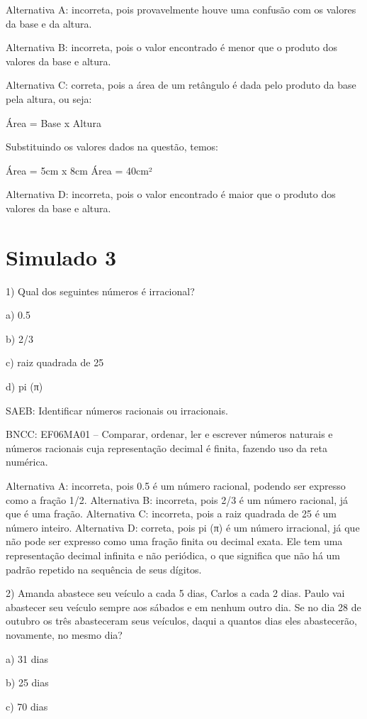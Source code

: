 Alternativa A: incorreta, pois provavelmente houve uma confusão com os
valores da base e da altura.

Alternativa B: incorreta, pois o valor encontrado é menor que o produto
dos valores da base e altura.

Alternativa C: correta, pois a área de um retângulo é dada pelo produto
da base pela altura, ou seja:

Área = Base x Altura

Substituindo os valores dados na questão, temos:

Área = 5cm x 8cm Área = 40cm²

Alternativa D: incorreta, pois o valor encontrado é maior que o produto
dos valores da base e altura.

\chapter{Simulado 3}

1) Qual dos seguintes números é irracional?

a) 0.5

b) 2/3

c) raiz quadrada de 25

d) pi (π)

SAEB: Identificar números racionais ou irracionais.

BNCC: EF06MA01 -- Comparar, ordenar, ler e escrever números naturais e
números racionais cuja representação decimal é finita, fazendo uso da
reta numérica.

Alternativa A: incorreta, pois 0.5 é um número racional, podendo ser
expresso como a fração 1/2. Alternativa B: incorreta, pois 2/3 é um
número racional, já que é uma fração. Alternativa C: incorreta, pois a
raiz quadrada de 25 é um número inteiro. Alternativa D: correta, pois pi
(π) é um número irracional, já que não pode ser expresso como uma fração
finita ou decimal exata. Ele tem uma representação decimal infinita e
não periódica, o que significa que não há um padrão repetido na
sequência de seus dígitos.

2) Amanda abastece seu veículo a cada 5 dias, Carlos a cada 2 dias.
Paulo vai abastecer seu veículo sempre aos sábados e em nenhum outro
dia. Se no dia 28 de outubro os três abasteceram seus veículos, daqui a
quantos dias eles abastecerão, novamente, no mesmo dia?

a) 31 dias

b) 25 dias

c) 70 dias

